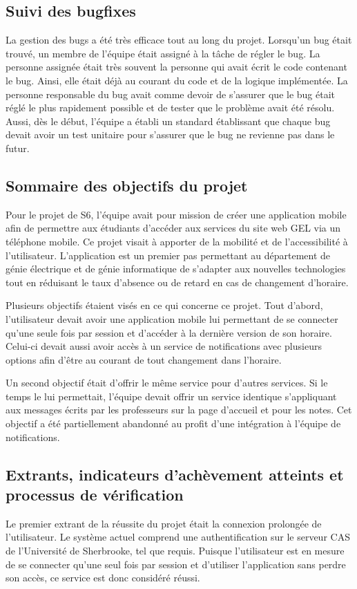     \subsection{Suivi des bugfixes}
    La gestion des bugs a été très efficace tout au long du projet. Lorsqu'un bug était trouvé, un membre de l'équipe était assigné à la tâche de régler le bug. La personne assignée était très souvent la personne qui avait écrit le code contenant le bug. Ainsi, elle était déjà au courant du code et de la logique implémentée. La personne responsable du bug avait comme devoir de s'assurer que le bug était réglé le plus rapidement possible et de tester que le problème avait été résolu. Aussi, dès le début, l'équipe a établi un standard établissant que chaque bug devait avoir un test unitaire pour s'assurer que le bug ne revienne pas dans le futur.

    \subsection{Sommaire des objectifs du projet}
    Pour le projet de S6, l'équipe avait pour mission de créer une application mobile afin de permettre aux étudiants d'accéder aux services du site web GEL via un téléphone mobile. Ce projet visait à apporter de la mobilité et de l'accessibilité à l'utilisateur. L'application est un premier pas permettant au département de génie électrique et de génie informatique de s'adapter aux nouvelles technologies tout en réduisant le taux d'absence ou de retard en cas de changement d'horaire.

    Plusieurs objectifs étaient visés en ce qui concerne ce projet. Tout d'abord, l'utilisateur devait avoir une application mobile lui permettant de se connecter qu'une seule fois par session et d'accéder à la dernière version de son horaire. Celui-ci devait aussi avoir accès à un service de notifications avec plusieurs options afin d'être au courant de tout changement dans l'horaire.

    Un second objectif était d'offrir le même service pour d'autres services. Si le temps le lui permettait, l'équipe devait offrir un service identique s'appliquant aux messages écrits par les professeurs sur la page d'accueil et pour les notes. Cet objectif a été partiellement abandonné au profit d'une intégration à l'équipe de notifications.

    \pagebreak
    \subsection{Extrants, indicateurs d'achèvement atteints et processus de vérification}
    Le premier extrant de la réussite du projet était la connexion prolongée de l'utilisateur. Le système actuel comprend une authentification sur le serveur CAS de l'Université de Sherbrooke, tel que requis. Puisque l'utilisateur est en mesure de se connecter qu'une seul fois par session et d'utiliser l'application sans perdre son accès, ce service est donc considéré réussi.

